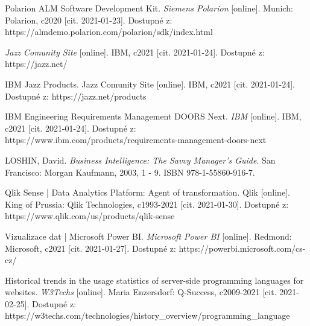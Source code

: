 \documentclass[czech,master,public,dept460,male,cpdeclaration,oneside]{diploma}
\begin{document}
\begin{thebibliography}{41}
Polarion ALM Software Development Kit. \textit{Siemens Polarion} [online]. Munich: Polarion, c2020 [cit. 2021-01-23]. Dostupné z: https://almdemo.polarion.com/polarion/sdk/index.html

\textit{Jazz Comunity Site} [online]. IBM, c2021 [cit. 2021-01-24]. Dostupné z: https://jazz.net/

IBM Jazz Products. Jazz Comunity Site [online]. IBM, c2021 [cit. 2021-01-24]. Dostupné z: https://jazz.net/products

IBM Engineering Requirements Management DOORS Next. \textit{IBM} [online]. IBM, c2021 [cit. 2021-01-24]. Dostupné z: https://www.ibm.com/products/requirements-management-doors-next

LOSHIN, David. \textit{Business Intelligence: The Savvy Manager's Guide}. San Francisco: Morgan Kaufmann, 2003, 1 - 9. ISBN 978-1-55860-916-7.

Qlik Sense | Data Analytics Platform: Agent of transformation. Qlik [online]. King of Prussia: Qlik Technologies, c1993-2021 [cit. 2021-01-30]. Dostupné z: https://www.qlik.com/us/products/qlik-sense

Vizualizace dat | Microsoft Power BI. \textit{Microsoft Power BI} [online]. Redmond: Microsoft, c2021 [cit. 2021-01-27]. Dostupné z: https://powerbi.microsoft.com/cs-cz/

Historical trends in the usage statistics of server-side programming languages for websites. \textit{W3Techs} [online]. Maria Enzersdorf: Q-Success, c2009-2021 [cit. 2021-02-25]. Dostupné z: https://w3techs.com/technologies/history\_overview/programming\_language

\end{thebibliography}
\end{document}
